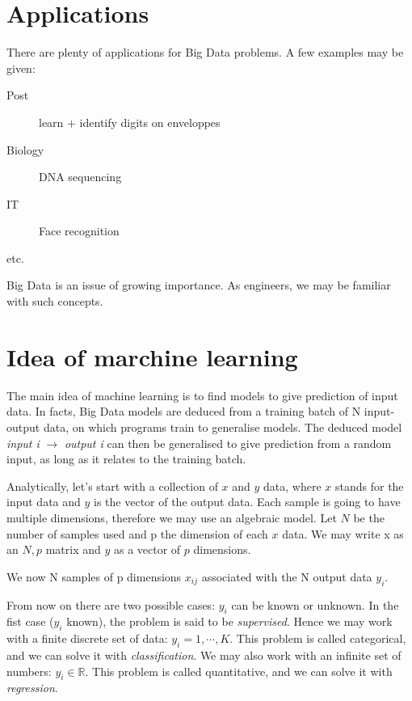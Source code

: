 \documentclass[a4paper]{tufte-book}
\begin{document}
\section*{Applications}

There are plenty of applications for Big Data problems. A few examples may be
given:
\begin{description}
    \item[Post] learn + identify digits on enveloppes
    \item[Biology] DNA sequencing
    \item[IT] Face recognition
    \item[etc.]
\end{description}

Big Data is an issue of growing importance. As engineers, we may be familiar 
with such concepts.
 \section*{Idea of marchine learning} 

The main idea of machine learning is to find models to give prediction of input data.
In facts, Big Data models are deduced from a training batch of N input-output
data, on which programs train to generalise models.
The deduced model \emph{input i} $\rightarrow$ \emph{output i} can then be
generalised to give prediction from a random input, as long as it relates to 
the training batch.



Analytically, let's start with a collection of $x$ and $y$ data, where $x$ 
stands for the input data and $y$ is the vector of the output data.
Each sample is going to have multiple dimensions, therefore we may use an
algebraic model. Let $N$ be the number of samples used and p the dimension of
each $x$ data. We may write x as an $N,p$ matrix and $y$ as a vector of $p$
dimensions.

We now N samples of p dimensions $x_{ij}$ associated with the N output data
$y_i$.

From now on there are two possible cases: $y_i$ can be known or unknown.
In the fist case ($y_i$ known), the problem is said to be \emph{supervised}.
Hence we may work with a finite discrete set of data: $y_i = 1, \cdots, K$.
This problem is called categorical, and we can solve it with 
\emph{classification}.
We may also work with an infinite set of numbers: $y_i \in \mathbb{R}$. This
problem is called quantitative, and we can solve it with \emph{regression}.
\end{document}
